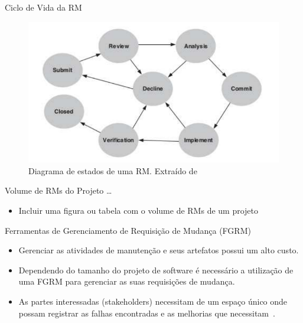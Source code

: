 \documentclass[t,14pt,mathserif]{beamer}
\begin{document}
\begin{frame}{Ciclo de Vida da RM}

    \begin{figure}[htpb]
        \centering
        \includegraphics[width=0.55\linewidth]{../img/diagrama-estado-rm.pdf}
        \caption{Diagrama de estados de uma RM\@. Extraído
            de~\cite{tripathy2014software}}
\label{fig:diagrama-estado-rm}
    \end{figure}

\end{frame}

\begin{frame}{Volume de RMs do Projeto \ldots}
	\begin{itemize}
         \item Incluir uma figura ou tabela com o volume de RMs de um projeto
	\end{itemize}
\end{frame}

\begin{frame}{Ferramentas de Gerenciamento de Requisição de Mudança (FGRM)}
	\begin{itemize}
        \item Gerenciar as atividades de manutenção e seus artefatos
            possui um alto custo.
        \item Dependendo do tamanho do projeto de software é necessário a
            utilização de uma FGRM para gerenciar as suas requisições de
            mudança.
        \item As partes interessadas (stakeholders) necessitam de um espaço
            único onde possam registrar as falhas encontradas e as melhorias que
            necessitam~\cite{1407819}.
	\end{itemize}
\end{frame}
\end{document}
